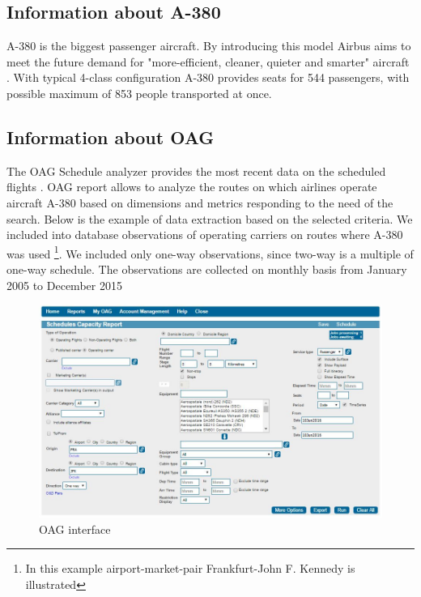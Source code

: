 \documentclass[titlepage, 11pt]{article}
\begin{document}
\singlespacing
\newpage
\begin{appendices}
\section{}\label{Appendix}
\subsection{Information about A-380} \label{A380info}
\tab A-380 is the biggest passenger aircraft. By introducing this model Airbus aims to meet the future demand for "more-efficient, cleaner, quieter and smarter" aircraft \cite{Airbus}.  %
With typical 4-class configuration A-380 provides seats for 544 passengers, with possible maximum of 853 people transported at once. 

\subsection{Information about OAG} \label{OAGinfo}
\tab The OAG Schedule analyzer provides the most recent data on the scheduled flights \cite{OAG}. OAG report allows to analyze the routes on which airlines operate aircraft A-380 based on dimensions and metrics responding to the need of the search. Below is the example of data extraction based on the selected criteria. We included into database observations of operating carriers on routes where A-380 was used \footnote{In this example airport-market-pair Frankfurt-John F. Kennedy is illustrated}. We included only one-way observations, since two-way is a multiple of one-way schedule. The observations are collected on monthly basis from January 2005 to December 2015
\begin{figure}[h]
\centering
\caption{OAG interface}
\includegraphics[width=150mm, scale = 1]{OAG.JPG}
\end{figure}

\end{appendices}
\end{document}
